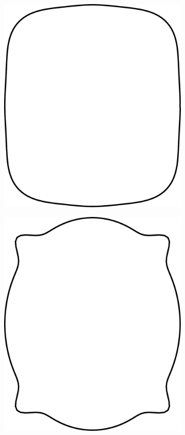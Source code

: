 \documentclass[pdftex,12pt,a4paper]{report}
\begin{document}
\begin{figure}[h]
	\centering
	\begin{subfigure}[b]{0.24\textwidth}
		\centering
		\includegraphics[width=.9\linewidth]{img/synthetic-generation/shapes/1.pdf}
	\end{subfigure}
	\begin{subfigure}[b]{0.24\textwidth}
		\centering
		\includegraphics[width=.9\linewidth]{img/synthetic-generation/shapes/2.pdf}

\end{subfigure}
\end{figure}
\end{document}
